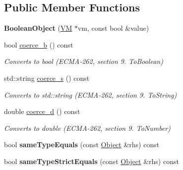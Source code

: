 \subsection*{Public Member Functions}
\begin{DoxyCompactItemize}
\item 
\hypertarget{classjswf_1_1avm2_1_1_boolean_object_aba0705eeb952a8474af409f0192dd725}{{\bfseries Boolean\+Object} (\hyperlink{classjswf_1_1avm2_1_1_v_m}{V\+M} $\ast$vm, const bool \&value)}\label{classjswf_1_1avm2_1_1_boolean_object_aba0705eeb952a8474af409f0192dd725}

\item 
\hypertarget{classjswf_1_1avm2_1_1_boolean_object_a8ebf06712c74f371f34e6fbe8fa7dfb3}{bool \hyperlink{classjswf_1_1avm2_1_1_boolean_object_a8ebf06712c74f371f34e6fbe8fa7dfb3}{coerce\+\_\+b} () const }\label{classjswf_1_1avm2_1_1_boolean_object_a8ebf06712c74f371f34e6fbe8fa7dfb3}

\begin{DoxyCompactList}\small\item\em Converts to {\ttfamily bool} (E\+C\+M\+A-\/262, section 9. {\itshape To\+Boolean}) \end{DoxyCompactList}\item 
std\+::string \hyperlink{classjswf_1_1avm2_1_1_boolean_object_a15d8e6b43434b3946e6fc377ba14a232}{coerce\+\_\+s} () const 
\begin{DoxyCompactList}\small\item\em Converts to {\ttfamily std\+::string} (E\+C\+M\+A-\/262, section 9. {\itshape To\+String}) \end{DoxyCompactList}\item 
\hypertarget{classjswf_1_1avm2_1_1_boolean_object_adcda0d16e0f3d549066510b58c95534f}{double \hyperlink{classjswf_1_1avm2_1_1_boolean_object_adcda0d16e0f3d549066510b58c95534f}{coerce\+\_\+d} () const }\label{classjswf_1_1avm2_1_1_boolean_object_adcda0d16e0f3d549066510b58c95534f}

\begin{DoxyCompactList}\small\item\em Converts to {\ttfamily double} (E\+C\+M\+A-\/262, section 9. {\itshape To\+Number}) \end{DoxyCompactList}\item 
\hypertarget{classjswf_1_1avm2_1_1_boolean_object_a7054f801b0c561873d983bf9c5c6b642}{bool {\bfseries same\+Type\+Equals} (const \hyperlink{classjswf_1_1avm2_1_1_object}{Object} \&rhs) const }\label{classjswf_1_1avm2_1_1_boolean_object_a7054f801b0c561873d983bf9c5c6b642}

\item 
\hypertarget{classjswf_1_1avm2_1_1_boolean_object_a6c86d27185f7d4c890515a7156e8af5b}{bool {\bfseries same\+Type\+Strict\+Equals} (const \hyperlink{classjswf_1_1avm2_1_1_object}{Object} \&rhs) const }\label{classjswf_1_1avm2_1_1_boolean_object_a6c86d27185f7d4c890515a7156e8af5b}

\end{DoxyCompactItemize}
